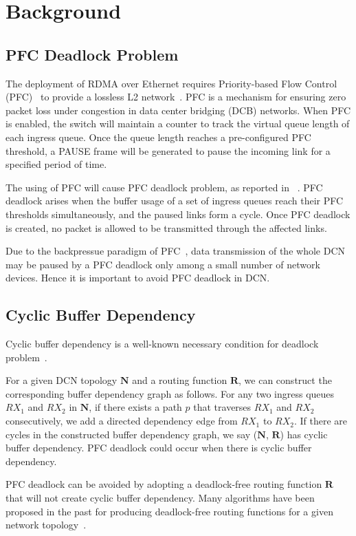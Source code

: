 \section{Background}\label{sec:background}

\subsection{PFC Deadlock Problem}\label{subsec:pfcdeadlock}

The deployment of RDMA over Ethernet requires Priority-based Flow Control (PFC)~\cite{pfc}  to provide a lossless L2 network~\cite{dcqcn, rdmaatscale}. 
PFC is a mechanism for ensuring zero packet loss under congestion in data center bridging (DCB) networks. When PFC is enabled, the switch will maintain a counter to track the virtual queue length of each ingress queue. Once the queue length reaches a pre-configured PFC threshold, a PAUSE frame will be generated to pause the incoming link for a specified period of time.

The using of PFC will cause PFC deadlock problem, as reported in ~\cite{dcqcn, rdmaatscale}. PFC deadlock arises when the buffer usage of a set of ingress queues reach their PFC thresholds simultaneously, and the paused links form a cycle. Once PFC deadlock is created, no packet is allowed to be transmitted through the affected links. 

Due to the backpressue paradigm of PFC~\cite{tcpbolt,dcqcn}, data transmission of the whole DCN may be paused by a PFC deadlock only among a small number of network devices. Hence it is important to avoid PFC deadlock in DCN.



\subsection{Cyclic Buffer Dependency}\label{subsec:cyclicbd}

Cyclic buffer dependency is a well-known necessary condition for deadlock problem~\cite{gerla1980flow}.

For a given DCN topology $\textbf{N}$ and a routing function $\textbf{R}$, we can construct the corresponding buffer dependency graph as follows. For any two ingress queues $RX_1$ and $RX_2$ in $\textbf{N}$, if there exists a path $p$ that traverses $RX_1$ and  $RX_2$ consecutively, we add a directed dependency edge from $RX_1$ to $RX_2$.  If there are cycles in the constructed buffer dependency graph, we say ($\textbf{N}$, $\textbf{R}$) has cyclic buffer dependency. PFC deadlock could occur when there is cyclic buffer dependency.

PFC deadlock can be avoided by adopting a deadlock-free routing function $\textbf{R}$ that will not create cyclic buffer dependency. Many algorithms have been proposed in the past for producing deadlock-free routing functions for a given network topology~\cite{dally,flich2012survey,tcpbolt}.

%
